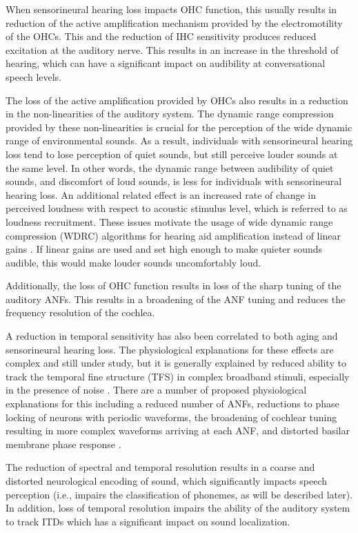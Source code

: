 When sensorineural hearing loss impacts OHC function, this usually results in reduction of the active amplification mechanism provided by the electromotility of the OHCs. This and the reduction of IHC sensitivity produces reduced excitation at the auditory nerve. This results in an increase in the threshold of hearing, which can have a significant impact on audibility at conversational speech levels. 

The loss of the active amplification provided by OHCs also results in a reduction in the non-linearities of the auditory system. The dynamic range compression provided by these non-linearities is crucial for the perception of the wide dynamic range of environmental sounds. As a result, individuals with sensorineural hearing loss tend to lose perception of quiet sounds, but still perceive louder sounds at the same level. In other words, the dynamic range between audibility of quiet sounds, and discomfort of loud sounds, is less for individuals with sensorineural hearing loss. An additional related effect is an increased rate of change in perceived loudness with respect to acoustic stimulus level, which is referred to as loudness recruitment. These issues motivate the usage of wide dynamic range compression (WDRC) algorithms for hearing aid amplification instead of linear gains \citep{dillon2012hearing}. If linear gains are used and set high enough to make quieter sounds audible, this would make louder sounds uncomfortably loud.

Additionally, the loss of OHC function results in loss of the sharp tuning of the auditory ANFs. This results in a broadening of the ANF tuning and reduces the frequency resolution of the cochlea. 

A reduction in temporal sensitivity has also been correlated to both aging and sensorineural hearing loss. The physiological explanations for these effects are complex and still under study, but it is generally explained by reduced ability to track the temporal fine structure (TFS) in complex broadband stimuli, especially in the presence of noise \citep{xia2018effects}. There are a number of proposed physiological explanations for this including a reduced number of ANFs, reductions to phase locking of neurons with periodic waveforms, the broadening of cochlear tuning resulting in more complex waveforms arriving at each ANF, and distorted basilar membrane phase response  \citep{tsironis2024adaptation}.

The reduction of spectral and temporal resolution results in a coarse and distorted neurological encoding of sound, which significantly impacts speech perception (i.e., impairs the classification of phonemes, as will be described later). In addition, loss of temporal resolution impairs the ability of the auditory system to track ITDs which has a significant impact on sound localization.

